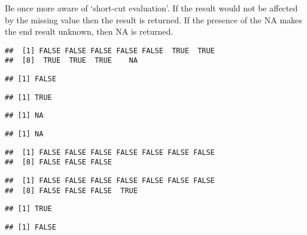 \documentclass[paper=a4,headsepline,BCOR=12mm,twoside,open=right,%
titlepage,headings=small,fontsize=10pt,index=totoc,bibliography=totoc,%
captions=tableheading,captions=nooneline]{scrbook}\usepackage{knitr}
\begin{document}
Be once more aware of `short-cut evaluation'. If the result would not be affected by the missing value then the result is returned. If the presence of the NA makes the end result unknown, then NA is returned.

\begin{knitrout}\footnotesize
{}\color{fgcolor}\begin{kframe}
\begin{alltt}
 \hlkwb{<-}  \hlstd{)}
 \hlopt{>} 
\end{alltt}
\begin{verbatim}
##  [1] FALSE FALSE FALSE FALSE FALSE  TRUE  TRUE
##  [8]  TRUE  TRUE  TRUE    NA
\end{verbatim}
\begin{alltt}
 \hlopt{>} \hlstd{)}
\end{alltt}
\begin{verbatim}
## [1] FALSE
\end{verbatim}
\begin{alltt}
 \hlopt{>} \hlstd{)}
\end{alltt}
\begin{verbatim}
## [1] TRUE
\end{verbatim}
\begin{alltt}
 \hlopt{<} \hlstd{)}
\end{alltt}
\begin{verbatim}
## [1] NA
\end{verbatim}
\begin{alltt}
 \hlopt{>} \hlstd{)}
\end{alltt}
\begin{verbatim}
## [1] NA
\end{verbatim}
\begin{alltt}
\end{alltt}
\begin{verbatim}
##  [1] FALSE FALSE FALSE FALSE FALSE FALSE FALSE
##  [8] FALSE FALSE FALSE
\end{verbatim}
\begin{alltt}
\end{alltt}
\begin{verbatim}
##  [1] FALSE FALSE FALSE FALSE FALSE FALSE FALSE
##  [8] FALSE FALSE FALSE  TRUE
\end{verbatim}
\begin{alltt}
\hlstd{(}
\end{alltt}
\begin{verbatim}
## [1] TRUE
\end{verbatim}
\begin{alltt}
\hlstd{(}
\end{alltt}
\begin{verbatim}
## [1] FALSE
\end{verbatim}
\end{kframe}
\end{knitrout}
\end{document}

